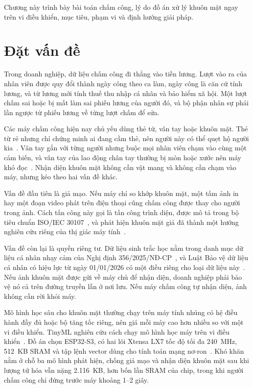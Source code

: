 \documentclass[../DoAn.tex]{subfiles}
\begin{document}
Chương này trình bày bài toán chấm công, lý do đồ án xử lý khuôn mặt ngay
trên vi điều khiển, mục tiêu, phạm vi và định hướng giải pháp.

\section{Đặt vấn đề}
\label{section:1.1}

Trong doanh nghiệp, dữ liệu chấm công đi thẳng vào tiền lương. Lượt vào ra
của nhân viên được quy đổi thành ngày công theo ca làm, ngày công là căn cứ
tính lương, và từ lương mới tính thuế thu nhập cá nhân và bảo hiểm xã hội.
Một lượt chấm sai hoặc bị mất làm sai phiếu lương của người đó, và bộ phận
nhân sự phải lần ngược từ phiếu lương về từng lượt chấm để sửa.

Các máy chấm công hiện nay chủ yếu dùng thẻ từ, vân tay hoặc khuôn mặt. Thẻ
từ rẻ nhưng chỉ chứng minh ai đang cầm thẻ, nên người này có thể quẹt hộ
người kia~\cite{jain2004}. Vân tay gắn với từng người nhưng buộc mọi nhân
viên chạm vào cùng một cảm biến, và vân tay của lao động chân tay thường bị
mòn hoặc xước nên máy khó đọc~\cite{jain2004}. Nhận diện khuôn mặt không cần
vật mang và không cần chạm vào máy, nhưng kéo theo hai vấn đề khác.

Vấn đề đầu tiên là giả mạo. Nếu máy chỉ so khớp khuôn mặt, một tấm ảnh in
hay một đoạn video phát trên điện thoại cũng chấm công được thay cho người
trong ảnh. Cách tấn công này gọi là tấn công trình diện, được mô tả trong bộ
tiêu chuẩn ISO/IEC 30107~\cite{iso30107}, và phát hiện khuôn mặt giả đã
thành một hướng nghiên cứu riêng của thị giác máy tính~\cite{yu2023fas}.

Vấn đề còn lại là quyền riêng tư. Dữ liệu sinh trắc học nằm trong danh mục
dữ liệu cá nhân nhạy cảm của Nghị định 356/2025/NĐ-CP~\cite{nd3562025}, và
Luật Bảo vệ dữ liệu cá nhân có hiệu lực từ ngày 01/01/2026 có một điều riêng
cho loại dữ liệu này~\cite{luat912025}. Nếu ảnh khuôn mặt được gửi về máy chủ
để nhận diện, doanh nghiệp phải bảo vệ nó cả trên đường truyền lẫn ở nơi lưu.
Nếu máy chấm công tự nhận diện, ảnh không cần rời khỏi máy.

Mô hình học sâu cho khuôn mặt thường chạy trên máy tính nhúng có hệ điều hành
đầy đủ hoặc bộ tăng tốc riêng, nên giá mỗi máy cao hơn nhiều so với một vi
điều khiển. TinyML nghiên cứu cách chạy mô hình học máy trên vi
điều khiển~\cite{warden2019,david2021}. Đồ án chọn ESP32-S3, có hai lõi Xtensa
LX7 tốc độ tối đa 240~MHz, 512~KB SRAM và tập lệnh vector dùng cho tính toán
mạng nơ-ron~\cite{esp32s3}. Khó khăn nằm ở chỗ ba mô hình phát hiện, chống giả
mạo và nhận diện khuôn mặt sau khi lượng tử hóa vẫn nặng 2.116~KB, hơn bốn lần
SRAM của chip, trong khi người chấm công chỉ đứng trước máy khoảng 1--2 giây.
\end{document}
